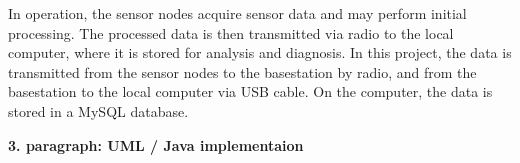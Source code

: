 \documentclass[12pt,a4paper]{scrartcl}
\begin{document}
In operation, the sensor nodes acquire sensor data and may perform initial processing.
The processed data is then transmitted via radio to the local computer, where it is stored for analysis and diagnosis.
In this project, the data is transmitted from the sensor nodes to the basestation by radio, and from the basestation to the local computer via USB cable.
On the computer, the data is stored in a MySQL database.



\textbf{3. paragraph: UML / Java implementaion}

%
%
%
%
%

\newpage

\end{document}

